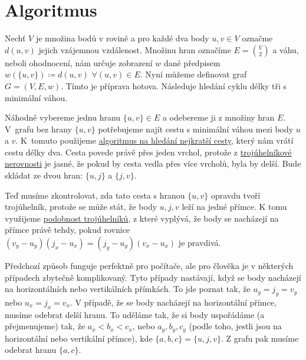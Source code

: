 \section{Algoritmus}
\label{sec:algoritmus}

Nechť $V$ je množina bodů v rovině a pro každé dva body $u, v \in V$ označme $d(u, v)$ jejich vzájemnou vzdálenost. Množinu hran označíme $E = \binom{V}{2}$ a váhu, neboli ohodnocení, nám určuje zobrazení $w$ dané předpisem $w(\{u, v\}) \coloneqq d(u, v)$ $\forall (u, v) \in E$. Nyní můžeme definovat graf $G = (V, E, w)$.
Tímto je příprava hotova. Následuje hledání cyklu délky tři s minimální váhou.



Náhodně vybereme jednu hranu $\{u, v\} \in E$ a odebereme ji z množiny hran $E$. V~grafu bez hrany $\{u, v\}$ potřebujeme najít cestu s minimální váhou mezi body $u$ a  $v$. K~tomuto použijeme \hyperref[sec:adaptace]{algoritmus na hledání nejkratší cesty}, který nám vrátí cestu délky dva. Cesta povede právě přes jeden vrchol, protože z \hyperref[tvrzeni:trojuhelnikova_nerovnost]{trojúhelníkové nerovnosti} je jasné, že pokud by cesta vedla přes více vrcholů, byla by delší. Bude skládat ze dvou hran: $\{u, j\}$ a $\{j, v\}$.

Teď musíme zkontrolovat, zda tato cesta s hranou $\{u, v\}$ opravdu tvoří trojúhelník, protože se může  stát, že body $u, j, v$ leží na jedné přímce. K tomu využijeme \hyperref[sec:podobnost]{podobnost trojúhelníků}, z které vyplývá, že body se nacházejí na přímce právě tehdy, pokud rovnice $(v_y - u_y)(j_x - u_x) = (j_y - u_y)(v_x - u_x)$ je pravdivá. 

\begin{poznamka}
Předchozí způsob funguje perfektně pro počítače, ale pro člověka je v některých případech zbytečně komplikovaný. Tyto případy nastávají, když se body nacházejí na horizontálních nebo vertikálních přímkách. To jde poznat tak, že $u_y = j_y = v_y$ nebo $u_x = j_x = v_x$.
V případě, že se body nacházejí na horizontální přímce, musíme odebrat delší hranu. To uděláme tak, že si body uspořádáme (a přejmenujeme) tak, že $a_x<b_x<c_x$, nebo $a_y, b_y, c_y$ (podle toho, jestli jsou na horizontální nebo vertikální přímce), kde $\{a, b, c\} = \{u, j, v\}$. Z grafu pak musíme odebrat hranu $\{a, c\}$.
\end{poznamka}


